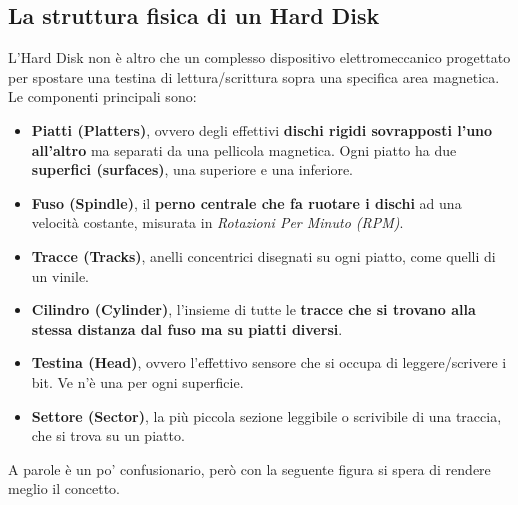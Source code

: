 \documentclass[12pt]{report}
\begin{document}
	\subsection{La struttura fisica di un Hard Disk}
	L'Hard Disk non è altro che un complesso dispositivo elettromeccanico progettato per spostare una testina di lettura/scrittura sopra una specifica area magnetica.\\
	Le componenti principali sono:
	\begin{itemize}
		\item \textbf{Piatti (Platters)}, ovvero degli effettivi \textbf{dischi rigidi sovrapposti l'uno all'altro} ma separati da una pellicola magnetica. Ogni piatto ha due \textbf{superfici (surfaces)}, una superiore e una inferiore.
		
		\item \textbf{Fuso (Spindle)}, il \textbf{perno centrale che fa ruotare i dischi} ad una velocità costante, misurata in \textit{Rotazioni Per Minuto (RPM)}.
		
		\item \textbf{Tracce (Tracks)}, anelli concentrici disegnati su ogni piatto, come quelli di un vinile.
		
		\item \textbf{Cilindro (Cylinder)}, l'insieme di tutte le \textbf{tracce che si trovano alla stessa distanza dal fuso ma su piatti diversi}.
		
		\item \textbf{Testina (Head)}, ovvero l'effettivo sensore che si occupa di leggere/scrivere i bit. Ve n'è una per ogni superficie.
		
		\item \textbf{Settore (Sector)}, la più piccola sezione leggibile o scrivibile di una traccia, che si trova su un piatto.
	\end{itemize}
	A parole è un po' confusionario, però con la seguente figura si spera di rendere meglio il concetto.
\end{document}
